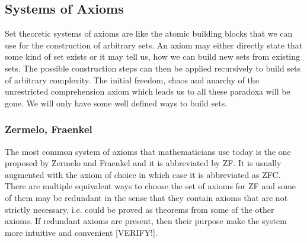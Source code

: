 




\subsection{Systems of Axioms}
Set theoretic systems of axioms are like the atomic building blocks that we can use for the construction of arbitrary sets. An axiom may either directly state that some kind of set exists or it may tell us, how we can build new sets from existing sets. The possible construction steps can then be applied recursively to build sets of arbitrary complexity. The initial freedom, chaos and anarchy of the unrestricted comprehension axiom which leads us to all these paradoxa will be gone. We will only have some well defined ways to build sets.

\subsubsection{Zermelo, Fraenkel}
The most common system of axioms that mathematicians use today is the one proposed by Zermelo and Fraenkel and it is abbreviated by ZF. It is usually augmented with the axiom of choice in which case it is abbreviated as ZFC. There are multiple equivalent ways to choose the set of axioms for ZF and some of them may be redundant in the sense that they contain axioms that are not strictly necessary, i.e. could be proved as theorems from some of the other axioms. If redundant axioms are present, then their purpose make the system more intuitive and convenient [VERIFY!].


